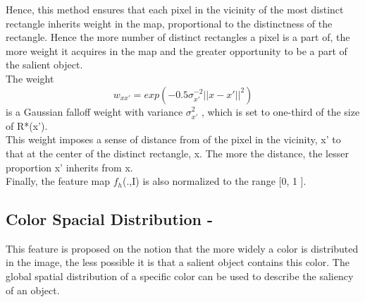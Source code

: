 \documentclass[11pt]{report}
\begin{document}
Hence, this method ensures that each pixel in the vicinity of the most distinct rectangle inherits weight in the map, proportional to the distinctness of the rectangle. Hence the more number of distinct rectangles a pixel is a part of, the more weight it acquires in the map and the greater opportunity to be a part of the salient object.\\
The weight 
\begin{equation}
w_{xx'} = exp(-0.5 \sigma_{x'}^{-2} ||x-x'||^2)
\end{equation} 
is a Gaussian falloff weight with variance $\sigma_{x'}^{2}$ , which is set to one-third of the size of R*(x').\\
This weight imposes a sense of distance from of the pixel in the vicinity, x' to that at the center of the distinct rectangle, x.
The more the distance, the lesser proportion x' inherits from x.\\
Finally, the feature map $f _h$(.,I) is also normalized to the range [0, 1 ]. \\

\subsection*{Color Spacial Distribution - }
This feature is proposed on the notion that the more widely a color is distributed in the image, the less possible it is that a salient object contains this color. 
The global spatial distribution of a specific color can be used to describe the saliency of an object.
\end{document}
